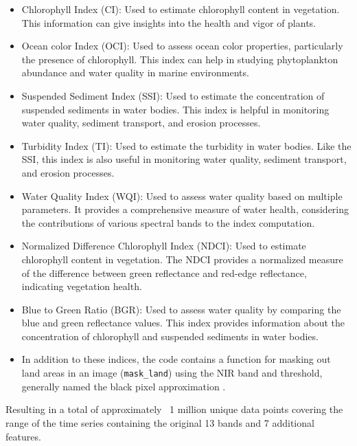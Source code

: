 \documentclass[journal,article,submit,pdftex,moreauthors]{Definitions/mdpi}
\begin{document}
 \begin{itemize}
	\item Chlorophyll Index (CI): Used to estimate chlorophyll content in vegetation. This information can give insights into the health and vigor of plants.
	
	\item Ocean color Index (OCI): Used to assess ocean color properties, particularly the presence of chlorophyll. This index can help in studying phytoplankton abundance and water quality in marine environments.
	
	\item Suspended Sediment Index (SSI): Used to estimate the concentration of suspended sediments in water bodies. This index is helpful in monitoring water quality, sediment transport, and erosion processes.
	
	\item Turbidity Index (TI): Used to estimate the turbidity in water bodies. Like the SSI, this index is also useful in monitoring water quality, sediment transport, and erosion processes.
	
	\item Water Quality Index (WQI): Used to assess water quality based on multiple parameters. It provides a comprehensive measure of water health, considering the contributions of various spectral bands to the index computation.
	
	\item Normalized Difference Chlorophyll Index (NDCI): Used to estimate chlorophyll content in vegetation. The NDCI provides a normalized measure of the difference between green reflectance and red-edge reflectance, indicating vegetation health.
	
	\item Blue to Green Ratio (BGR): Used to assess water quality by comparing the blue and green reflectance values. This index provides information about the concentration of chlorophyll and suspended sediments in water bodies.
	
	\item In addition to these indices, the code contains a function for masking out land areas in an image (\texttt{mask\_land}) using the NIR band and threshold, generally named the black pixel approximation \cite{siegel2000atmospheric}.
\end{itemize}
Resulting in a total of approximately ~1 million unique data points covering the range of the time series containing the original 13 bands and 7 additional features.
\end{document}
